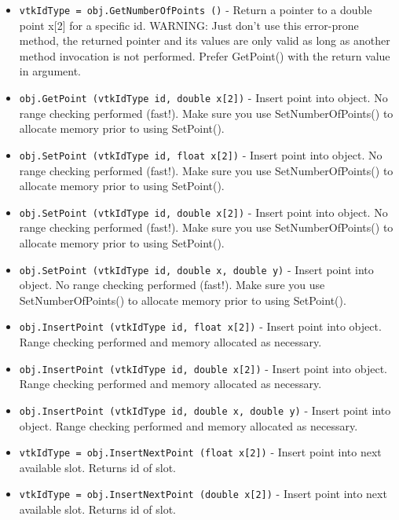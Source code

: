\begin{itemize}
\item  \verb|vtkIdType = obj.GetNumberOfPoints ()| -  Return a pointer to a double point x[2] for a specific id.
 WARNING: Just don't use this error-prone method, the returned pointer
 and its values are only valid as long as another method invocation is not
 performed. Prefer GetPoint() with the return value in argument.

\item  \verb|obj.GetPoint (vtkIdType id, double x[2])| -  Insert point into object. No range checking performed (fast!).
 Make sure you use SetNumberOfPoints() to allocate memory prior
 to using SetPoint().

\item  \verb|obj.SetPoint (vtkIdType id, float x[2])| -  Insert point into object. No range checking performed (fast!).
 Make sure you use SetNumberOfPoints() to allocate memory prior
 to using SetPoint().

\item  \verb|obj.SetPoint (vtkIdType id, double x[2])| -  Insert point into object. No range checking performed (fast!).
 Make sure you use SetNumberOfPoints() to allocate memory prior
 to using SetPoint().

\item  \verb|obj.SetPoint (vtkIdType id, double x, double y)| -  Insert point into object. No range checking performed (fast!).
 Make sure you use SetNumberOfPoints() to allocate memory prior
 to using SetPoint().

\item  \verb|obj.InsertPoint (vtkIdType id, float x[2])| -  Insert point into object. Range checking performed and memory
 allocated as necessary.

\item  \verb|obj.InsertPoint (vtkIdType id, double x[2])| -  Insert point into object. Range checking performed and memory
 allocated as necessary.

\item  \verb|obj.InsertPoint (vtkIdType id, double x, double y)| -  Insert point into object. Range checking performed and memory
 allocated as necessary.

\item  \verb|vtkIdType = obj.InsertNextPoint (float x[2])| -  Insert point into next available slot. Returns id of slot.

\item  \verb|vtkIdType = obj.InsertNextPoint (double x[2])| -  Insert point into next available slot. Returns id of slot.


\end{itemize}
